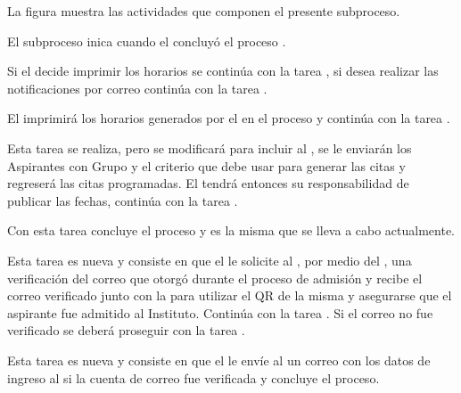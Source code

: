 La figura  muestra las actividades que componen el presente subproceso.


\begin{PDescripcion}
	\Ppaso [\Einicio] El subproceso inica cuando el  concluyó el proceso  .
	
	\Ppaso [\iCompuerta] Si el  decide imprimir los horarios se continúa con la tarea , si desea realizar las notificaciones por correo continúa con la tarea .
	
	\Ppaso [\itarea]  El  imprimirá los horarios generados por el  en el proceso  y continúa con la tarea .
	
	\Ppaso [\itarea]  Esta tarea se realiza, pero se modificará para incluir al , se le enviarán los Aspirantes con Grupo y el criterio que debe usar para generar las citas y regreserá las citas programadas. El  tendrá entonces su responsabilidad de publicar las fechas, continúa con la tarea .
	
	\Ppaso [\itarea]   Con esta tarea concluye el proceso y es la misma que se lleva a cabo actualmente.
	
	\Ppaso [\itarea]  Esta tarea es nueva y consiste en que el  le solicite al , por medio del , una verificación del correo que otorgó durante el proceso de admisión y recibe el correo verificado junto con la  para utilizar el QR  de la misma y asegurarse que el aspirante fue admitido al Instituto. Continúa con la tarea . Si el correo no fue verificado se deberá proseguir con la tarea .
	
	
	\Ppaso [\itarea] Esta tarea es nueva y consiste en que el  le envíe al  un correo con los datos de ingreso al  si la cuenta de correo fue verificada y concluye el proceso. 
\end{PDescripcion}

